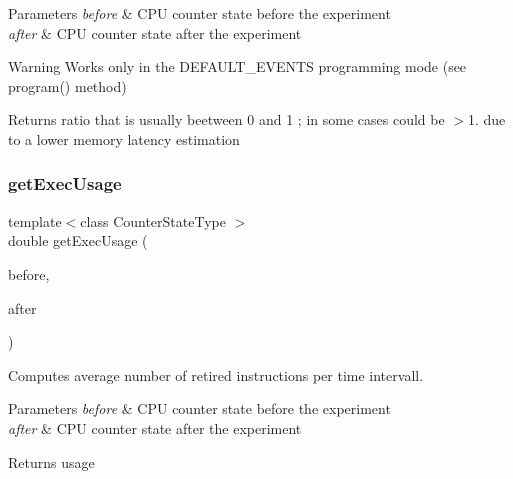 \begin{DoxyParams}{Parameters}
{\em before} & C\+PU counter state before the experiment \\
\hline
{\em after} & C\+PU counter state after the experiment \\
\hline
\end{DoxyParams}
\begin{DoxyWarning}{Warning}
Works only in the D\+E\+F\+A\+U\+L\+T\+\_\+\+E\+V\+E\+N\+TS programming mode (see program() method) 
\end{DoxyWarning}
\begin{DoxyReturn}{Returns}
ratio that is usually beetween 0 and 1 ; in some cases could be $>$1. due to a lower memory latency estimation 
\end{DoxyReturn}
\mbox{\label{class_basic_counter_state_a159a6896f5ef3626b88cdd27a3c15ac0}} 
\subsubsection{\texorpdfstring{get\+Exec\+Usage}{getExecUsage}}
{\footnotesize\ttfamily template$<$class Counter\+State\+Type $>$ \\
double get\+Exec\+Usage (\begin{DoxyParamCaption}\item[{const Counter\+State\+Type \&}]{before,  }\item[{const Counter\+State\+Type \&}]{after }\end{DoxyParamCaption})\hspace{0.3cm}{\ttfamily [friend]}}



Computes average number of retired instructions per time intervall. 


\begin{DoxyParams}{Parameters}
{\em before} & C\+PU counter state before the experiment \\
\hline
{\em after} & C\+PU counter state after the experiment \\
\hline
\end{DoxyParams}
\begin{DoxyReturn}{Returns}
usage 
\end{DoxyReturn}
\mbox{\label{class_basic_counter_state_af124718a7620c7bbca81232c2149f771}} 
